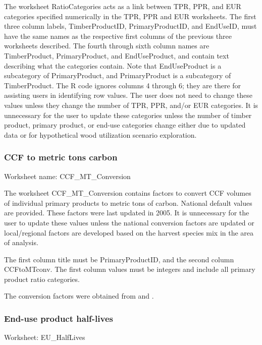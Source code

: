 \documentclass[
  openany]{book}
\begin{document}
The worksheet RatioCategories acts as a link between TPR, PPR, and EUR categories specified numerically in the TPR, PPR and EUR worksheets. The first three column labels, TimberProductID, PrimaryProductID, and EndUseID, must have the same names as the respective first columns of the previous three worksheets described. The fourth through sixth column names are TimberProduct, PrimaryProduct, and EndUseProduct, and contain text describing what the categories contain. Note that EndUseProduct is a subcategory of PrimaryProduct, and PrimaryProduct is a subcategory of TimberProduct. The R code ignores columns 4 through 6; they are there for assisting users in identifying row values. The user does not need to change these values unless they change the number of TPR, PPR, and/or EUR categories. It is unnecessary for the user to update these categories unless the number of timber product, primary product, or end-use categories change either due to updated data or for hypothetical wood utilization scenario exploration.

\hypertarget{own-prov-input-ccfMTC}{%
\subsubsection{CCF to metric tons carbon}\label{own-prov-input-ccfMTC}}

Worksheet name: CCF\_MT\_Conversion

The worksheet CCF\_MT\_Conversion contains factors to convert CCF volumes of individual primary products to metric tons of carbon. National default values are provided. These factors were last updated in 2005. It is unnecessary for the user to update these values unless the national conversion factors are updated or local/regional factors are developed based on the harvest species mix in the area of analysis.

The first column title must be PrimaryProductID, and the second column CCFtoMTconv. The first column values must be integers and include all primary product ratio categories.

The conversion factors were obtained from \textcite{smith2006} and \textcite{skog2008}.

\hypertarget{own-prov-input-euhl}{%
\subsubsection{End-use product half-lives}\label{own-prov-input-euhl}}

Worksheet: EU\_HalfLives
\end{document}

